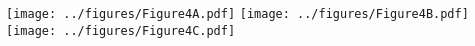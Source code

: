 \documentclass[class=minimal,border=0pt]{standalone}
\begin{document}
\texttt{[image: ../figures/Figure4A.pdf]}
\texttt{[image: ../figures/Figure4B.pdf]}
\texttt{[image: ../figures/Figure4C.pdf]}
\end{document}
